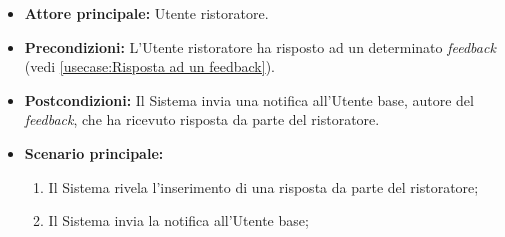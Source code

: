 \label{usecase:Notifica risposta feedback}
\begin{itemize}
	\item \textbf{Attore principale:} Utente ristoratore.
	
	\item \textbf{Precondizioni:} L'Utente ristoratore ha risposto ad un determinato \textit{feedback} (vedi \autoref{usecase:Risposta ad un feedback}).

    
	\item \textbf{Postcondizioni:} Il Sistema invia una notifica all'Utente base, autore del \textit{feedback}, che ha ricevuto risposta da parte del ristoratore.
     
	\item \textbf{Scenario principale:}
	      \begin{enumerate}
                \item Il Sistema rivela l'inserimento di una risposta da parte del ristoratore;
                \item Il Sistema invia la notifica all'Utente base;
	      \end{enumerate}
\end{itemize}